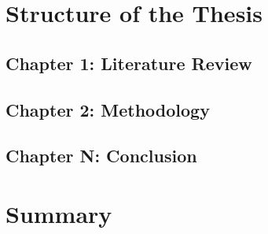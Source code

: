 \section{Structure of the Thesis}

\subsection{Chapter 1: Literature Review}

\subsection{Chapter 2: Methodology}



\subsection{Chapter N: Conclusion}


\section{Summary}

